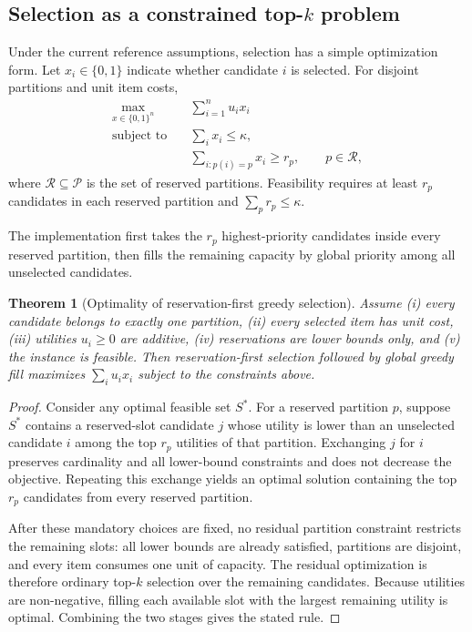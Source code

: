 \documentclass[11pt]{article}
\newcommand{\Bool}{\{0,1\}}
\newtheorem{theorem}{Theorem}
\begin{document}
\subsection{Selection as a constrained top-$k$ problem}

Under the current reference assumptions, selection has a simple optimization form. Let \(x_i\in\Bool\) indicate whether candidate \(i\) is selected. For disjoint partitions and unit item costs,
\[
\begin{aligned}
\max_{x\in\Bool^n}\quad &\sum_{i=1}^n u_i x_i\\
\text{subject to}\quad
&\sum_i x_i\le\kappa,\\
&\sum_{i:p(i)=p}x_i\ge r_p,\qquad p\in\mathcal R,
\end{aligned}
\]
where \(\mathcal R\subseteq\mathcal P\) is the set of reserved partitions. Feasibility requires at least \(r_p\) candidates in each reserved partition and \(\sum_p r_p\le\kappa\).

The implementation first takes the \(r_p\) highest-priority candidates inside every reserved partition, then fills the remaining capacity by global priority among all unselected candidates.

\begin{theorem}[Optimality of reservation-first greedy selection]
Assume (i) every candidate belongs to exactly one partition, (ii) every selected item has unit cost, (iii) utilities \(u_i\ge0\) are additive, (iv) reservations are lower bounds only, and (v) the instance is feasible. Then reservation-first selection followed by global greedy fill maximizes \(\sum_i u_i x_i\) subject to the constraints above.
\end{theorem}

\begin{proof}
Consider any optimal feasible set \(S^*\). For a reserved partition \(p\), suppose \(S^*\) contains a reserved-slot candidate \(j\) whose utility is lower than an unselected candidate \(i\) among the top \(r_p\) utilities of that partition. Exchanging \(j\) for \(i\) preserves cardinality and all lower-bound constraints and does not decrease the objective. Repeating this exchange yields an optimal solution containing the top \(r_p\) candidates from every reserved partition.

After these mandatory choices are fixed, no residual partition constraint restricts the remaining slots: all lower bounds are already satisfied, partitions are disjoint, and every item consumes one unit of capacity. The residual optimization is therefore ordinary top-$k$ selection over the remaining candidates. Because utilities are non-negative, filling each available slot with the largest remaining utility is optimal. Combining the two stages gives the stated rule.
\end{proof}
\end{document}
